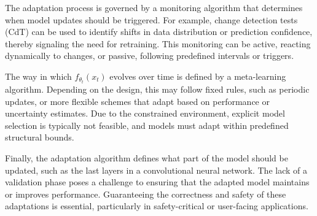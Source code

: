 The adaptation process is governed by a monitoring algorithm that determines when model updates should be triggered. 
For example, change detection tests (CdT) can be used to identify shifts in data distribution or prediction confidence, thereby signaling the need for retraining. 
This monitoring can be active, reacting dynamically to changes, or passive, following predefined intervals or triggers.

The way in which $f_{\theta_t}(x_t)$ evolves over time is defined by a meta-learning algorithm. 
Depending on the design, this may follow fixed rules, such as periodic updates, or more flexible schemes that adapt based on performance or uncertainty estimates. 
Due to the constrained environment, explicit model selection is typically not feasible, and models must adapt within predefined structural bounds.

Finally, the adaptation algorithm defines what part of the model should be updated, such as the last layers in a convolutional neural network. 
The lack of a validation phase poses a challenge to ensuring that the adapted model maintains or improves performance. 
Guaranteeing the correctness and safety of these adaptations is essential, particularly in safety-critical or user-facing applications.